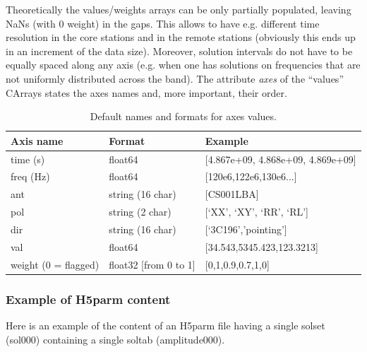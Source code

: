 \documentclass[]{article}
\begin{document}
Theoretically the values/weights arrays can be only partially populated, leaving NaNs (with 0 weight) in the gaps. This allows to have e.g. different time resolution in the core stations and in the remote stations (obviously this ends up in an increment of the data size). Moreover, solution intervals do not have to be equally spaced along any axis (e.g. when one has solutions on frequencies that are not uniformly distributed across the band). The attribute \textit{axes} of the ``values'' CArrays states the axes names and, more important, their order.

\begin{table}[!h]
\centering
\begin{tabular}{l l l}
\hline
\hline
Axis name & Format & Example\\
\hline
time (s) & float64 & [4.867e+09, 4.868e+09, 4.869e+09] \\
freq (Hz) & float64 & [120e6,122e6,130e6...]\\
ant & string (16 char) & [CS001LBA]\\
pol & string (2 char) & [‘XX’, ‘XY’, ‘RR’, ‘RL’]\\
dir & string (16 char)& [‘3C196’,’pointing’]\\
val & float64 & [34.543,5345.423,123.3213]\\
weight (0 = flagged) & float32 [from 0 to 1] & [0,1,0.9,0.7,1,0]\\
\hline
\end{tabular}
\caption{Default names and formats for axes values. \label{losoto:tab:axes}}
\end{table}

\subsubsection{Example of H5parm content}

Here is an example of the content of an H5parm file having a single solset (sol000) containing a single soltab (amplitude000).
\end{document}
